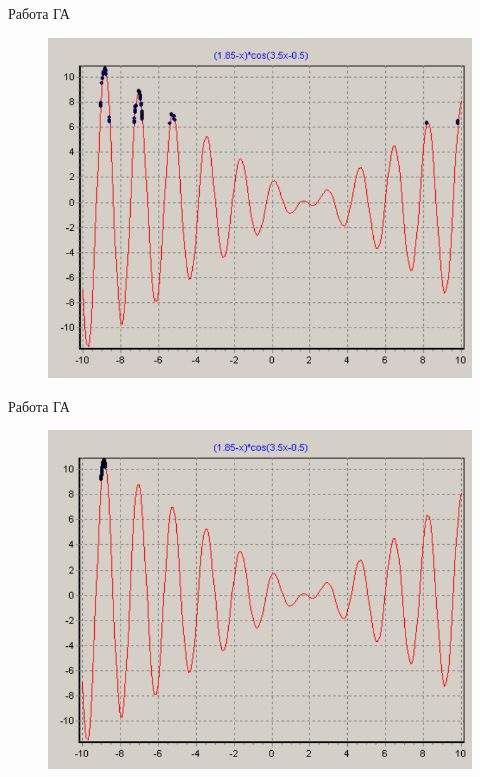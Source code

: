 \documentclass{beamer}
\begin{document}
\begin{frame}{Работа ГА}
\begin{figure}[h]
\centering
\includegraphics[scale=0.4]{images/lec04-pic16.png}
\end{figure}
\end{frame}

\begin{frame}{Работа ГА}
\begin{figure}[h]
\centering
\includegraphics[scale=0.4]{images/lec04-pic17.png}
\end{figure}
\end{frame}
\end{document}
